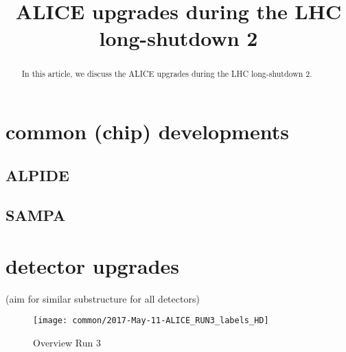 \documentclass[ALICE,manyauthors]{cernphprep}
\begin{document}
\begin{titlepage}

\title{ALICE upgrades during the LHC long-shutdown 2}


\begin{abstract}
In this article, we discuss the ALICE upgrades during the LHC long-shutdown 2.
\end{abstract}
\end{titlepage}

\setcounter{page}{2} %

\tableofcontents
\listoffigures

\nocite{EBGuidelineEditing}





\section{common (chip) developments}
\subsection{ALPIDE}
\subsection{SAMPA}

\section{detector upgrades}
(aim for similar substructure for all detectors)

\begin{figure}
\centering
\texttt{[image: common/2017-May-11-ALICE\_RUN3\_labels\_HD]}
\caption{Overview Run 3}
\label{fig:alice_run3}
\end{figure}
\end{document}
